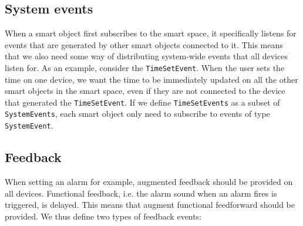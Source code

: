 % 


\subsection{System events}
\label{SystemEvents}
When a smart object first subscribes to the smart space, it specifically listens for events that are generated by other smart objects connected to it. This means that we also need some way of distributing system-wide events that all devices listen for. As an example, consider the \texttt{TimeSetEvent}. When the user sets the time on one device, we want the time to be immediately updated on all the other smart objects in the smart space, even if they are not connected to the device that generated the \texttt{TimeSetEvent}. If we define \texttt{TimeSetEvents} as a subset of \texttt{SystemEvents}, each smart object only need to subscribe to events of type \texttt{SystemEvent}.


\subsection{Feedback}
When setting an alarm for example, augmented feedback should be provided on all devices. Functional feedback, i.e. the alarm sound when an alarm fires is triggered, is delayed. This means that augment functional feedforward should be provided. We thus define two types of feedback events:

